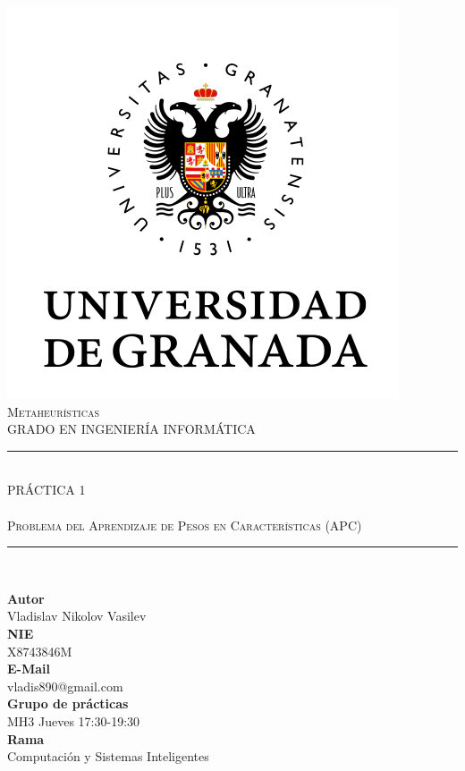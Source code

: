\documentclass[11pt,a4paper]{article}
\begin{document}

\begin{titlepage}

\begin{minipage}{\textwidth}

\centering

\includegraphics[scale=0.3]{img/ugr.png}\\

\textsc{\Large Metaheurísticas\\[0.2cm]}
\textsc{GRADO EN INGENIERÍA INFORMÁTICA}\\[0.3cm]

\noindent\rule[-1ex]{\textwidth}{1pt}\\[1.5ex]
\textsc{{\Huge PRÁCTICA 1\\[0.1cm]}}
\textsc{{\Large \\Problema del Aprendizaje de Pesos en Características (APC)}}
\noindent\rule[-1ex]{\textwidth}{2pt}\\[3.5ex]

\end{minipage}

\vspace{0.5cm}

\begin{minipage}{\textwidth}

\centering

\textbf{Autor}\\ {Vladislav Nikolov Vasilev}\\[1ex]
\textbf{NIE}\\ {X8743846M}\\[1ex]
\textbf{E-Mail}\\ {vladis890@gmail.com}\\[1ex]
\textbf{Grupo de prácticas}\\ {MH3 Jueves 17:30-19:30}\\[1ex]
\textbf{Rama}\\ {Computación y Sistemas Inteligentes}\\[1ex]
\vspace{0.2cm}


\end{minipage}
\end{titlepage}
\end{document}
